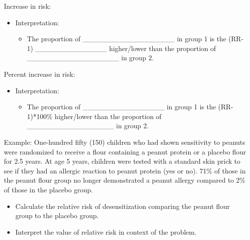 \documentclass[
]{report}
\providecommand{\tightlist}{%
  \setlength{\itemsep}{0pt}\setlength{\parskip}{0pt}}
\begin{document}
Increase in risk:

\vspace{0.3in}

\begin{itemize}
\item
  Interpretation:

  \begin{itemize}
  \tightlist
  \item
    The proportion of \_\_\_\_\_\_\_\_\_\_\_\_\_\_\_\_\_\_ in group 1 is the (RR-1) \_\_\_\_\_\_\_\_\_\_\_\_\_\_
    higher/lower than the proportion of \_\_\_\_\_\_\_\_\_\_\_\_\_\_\_\_\_\_ in group 2.
  \end{itemize}
\end{itemize}

Percent increase in risk:

\vspace{0.3in}

\begin{itemize}
\item
  Interpretation:

  \begin{itemize}
  \tightlist
  \item
    The proportion of \_\_\_\_\_\_\_\_\_\_\_\_\_\_\_\_ in group 1 is the (RR-1)*100\% higher/lower than the proportion of \_\_\_\_\_\_\_\_\_\_\_\_\_\_\_\_\_ in group 2.
  \end{itemize}
\end{itemize}


Example: One-hundred fifty (150) children who had shown sensitivity to peanuts were randomized to receive a flour containing a peanut protein or a placebo flour for 2.5 years. At age 5 years, children were tested with a standard skin prick to see if they had an allergic reaction to peanut protein (yes or no). 71\% of those in the peanut flour group no longer demonstrated a peanut allergy compared to 2\% of those in the placebo group.

\begin{itemize}
\tightlist
\item
  Calculate the relative risk of desensitization comparing the peanut flour group to the placebo group.
\end{itemize}

\vspace{0.8in}

\begin{itemize}
\tightlist
\item
  Interpret the value of relative risk in context of the problem.
\end{itemize}
\end{document}
